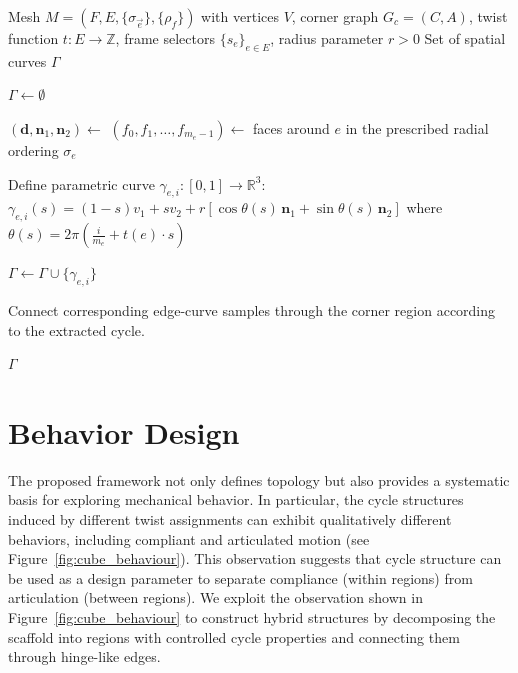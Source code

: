 \documentclass[acmtog]{acmart}
\begin{document}
\begin{algorithm}[htb!]
\caption{Geometric Realization with Combinatorial Frames}
\label{alg:geometric_realization}
\begin{algorithmic}[1]
\Require Mesh $M = (F, E, \{\sigma_{\vec{e}}\}, \{\rho_f\})$ with vertices $V$, corner graph $G_c = (C, A)$, twist function $t : E \to \mathbb{Z}$, frame selectors $\{s_e\}_{e \in E}$, radius parameter $r > 0$
\Ensure Set of spatial curves $\Gamma$

\State $\Gamma \gets \emptyset$

    \State $(\mathbf{d}, \mathbf{n}_1, \mathbf{n}_2) \gets$ 
    \State $(f_0,f_1,\ldots,f_{m_e-1}) \leftarrow$ faces around $e$ in the prescribed radial ordering $\sigma_e$
    
        \State Define parametric curve $\gamma_{e,i} : [0,1] \to \mathbb{R}^3$:
        \Statex \hspace{2em}
        $\displaystyle
        \gamma_{e,i}(s) = (1-s)v_1 + s v_2 + r \left[\cos\theta(s) \, \mathbf{n}_1 + \sin\theta(s) \, \mathbf{n}_2\right]
        $
        \Statex \hspace{2em}
        where $\theta(s) = 2\pi\left(\frac{i}{m_e} + t(e) \cdot s\right)$
        
        \State $\Gamma \gets \Gamma \cup \{\gamma_{e,i}\}$
    \EndFor
\EndFor

    \State Connect corresponding edge-curve samples through the corner region according to the extracted cycle.
\EndFor

\State \Return $\Gamma$
\end{algorithmic}
\end{algorithm}



\section{Behavior Design}

The proposed framework not only defines topology but also provides a systematic basis for exploring mechanical behavior. In particular, the cycle structures induced by different twist assignments can exhibit qualitatively different behaviors, including compliant and articulated motion (see Figure~\ref{fig:cube_behaviour}). This observation suggests that cycle structure can be used as a design parameter to separate compliance (within regions) from articulation (between regions). We exploit the observation shown in Figure~\ref{fig:cube_behaviour} to construct hybrid structures by decomposing the scaffold into regions with controlled cycle properties and connecting them through hinge-like edges.
\end{document}
